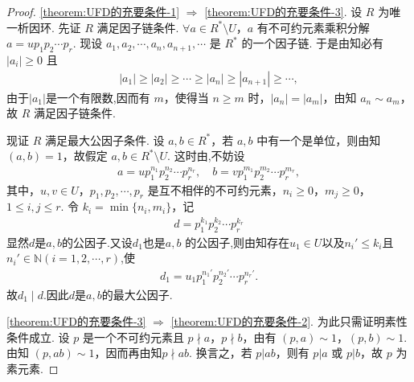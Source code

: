 \documentclass[../../main.tex]{subfiles}%
\begin{document}
\begin{proof}
\ref{theorem:UFD的充要条件-1} \( \Rightarrow \) \ref{theorem:UFD的充要条件-3}. 设 \( R \) 为唯一析因环. 先证 \( R \) 满足因子链条件. \( \forall a \in R^* \setminus U \)，\( a \) 有不可约元素乘积分解 \( a = up_1p_2\cdots p_r \).
现设 \( a_1, a_2, \cdots, a_n, a_{n+1}, \cdots \) 是 \( R^* \) 的一个因子链. 于是由知必有 \( |a_i| \geqslant 0 \) 且
\begin{align*}
|a_1| \geqslant |a_2| \geqslant \cdots \geqslant |a_n| \geqslant |a_{n+1}| \geqslant \cdots,
\end{align*}
由于$|a_1|$是一个有限数,因而有 \( m \)，使得当 \( n \geqslant m \) 时，\( |a_n| = |a_m| \)，由知 \( a_n \sim a_m \)，故 \( R \) 满足因子链条件.

现证 \( R \) 满足最大公因子条件. 设 \( a, b \in R^* \)，若 \( a, b \) 中有一个是单位，则由知$(a,b)=1$，故假定 \( a, b \in R^* \setminus U \). 这时由,不妨设
\begin{gather*}
a = up_1^{n_1}p_2^{n_2}\cdots p_r^{n_r}, \quad
b = vp_1^{m_1}p_2^{m_2}\cdots p_r^{m_r}, 
\end{gather*}
其中，\( u, v \in U \)，\( p_1, p_2, \cdots, p_r \) 是互不相伴的不可约元素，\( n_i \geqslant 0 \)，\( m_j \geqslant 0 \)，\( 1 \leqslant i, j \leqslant r \). 令 \( k_i = \min\{n_i, m_i\} \)，记
\begin{align}
d = p_1^{k_1}p_2^{k_2}\cdots p_r^{k_r} \label{eq:2.4.6}
\end{align}
显然$d$是$a,b$的公因子.又设$d_1$也是\( a, b \) 的公因子,则由知存在$u_1\in U$以及$n_i'\leqslant k_i $且$n_i'\in \mathbb{N}(i=1,2,\cdots,r)$,使
\begin{align*}
d_1 = u_1p_1^{n_1'}p_2^{n_2'}\cdots p_r^{n_r'}.
\end{align*}
故$d_1\mid d$.因此$d$是$a,b$的最大公因子.

\ref{theorem:UFD的充要条件-3} \( \Rightarrow \) \ref{theorem:UFD的充要条件-2}. 为此只需证明素性条件成立. 设 \( p \) 是一个不可约元素且 \( p \nmid a \)，\( p \nmid b \)，由有 \( (p, a) \sim 1 \)，\( (p, b) \sim 1 \). 由知 \( (p, ab) \sim 1 \)，因而再由知\( p \nmid ab \). 换言之，若 \( p|ab \)，则有 \( p|a \) 或 \( p|b \)，故 \( p \) 为素元素.


\end{proof}
\end{document}
